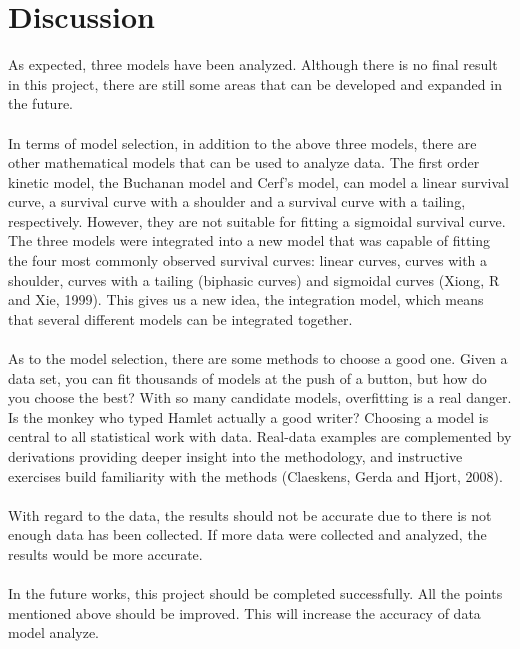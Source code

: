 \documentclass[11pt]{article}
\begin{document}
  \section{Discussion}
  As expected, three models have been analyzed. Although there is no final result in this project, there are still some areas that can be developed and expanded in the future. 
  \\\\In terms of model selection, in addition to the above three models, there are other mathematical models that can be used to analyze data. The first order kinetic model, the Buchanan model and Cerf's model, can model a linear survival curve, a survival curve with a shoulder and a survival curve with a tailing, respectively. However, they are not suitable for fitting a sigmoidal survival curve. The three models were integrated into a new model that was capable of fitting the four most commonly observed survival curves: linear curves, curves with a shoulder, curves with a tailing (biphasic curves) and sigmoidal curves (Xiong, R and Xie, 1999). This gives us a new idea, the integration model, which means that several different models can be integrated together.
  \\\\As to the model selection, there are some methods to choose a good one. Given a data set, you can fit thousands of models at the push of a button, but how do you choose the best? With so many candidate models, overfitting is a real danger. Is the monkey who typed Hamlet actually a good writer? Choosing a model is central to all statistical work with data.  Real-data examples are complemented by derivations providing deeper insight into the methodology, and instructive exercises build familiarity with the methods (Claeskens, Gerda and Hjort, 2008).
  \\\\With regard to the data, the results should not be accurate due to there is not enough data has been collected. If more data were collected and analyzed, the results would be more accurate.
  \\\\In the future works, this project should be completed successfully. All the points mentioned above should be improved. This will increase the accuracy of data model analyze.

      
 
  
  
  
\end{document}
